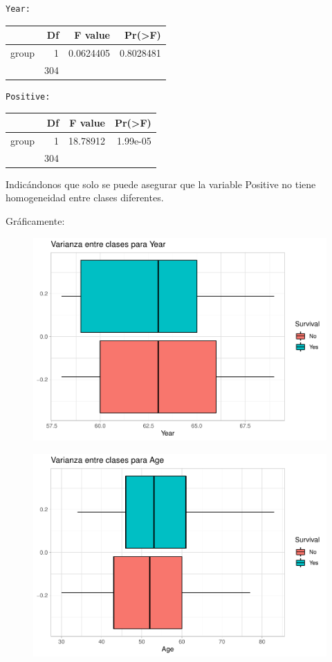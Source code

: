 \begin{verbatim}
Year:
\end{verbatim}

\begin{tabular}{l|r|r|r}
\hline
  & Df & F value & Pr(>F)\\
\hline
group & 1 & 0.0624405 & 0.8028481\\
\hline
 & 304 &  & \\
\hline
\end{tabular}

\begin{verbatim}
Positive:
\end{verbatim}

\begin{tabular}{l|r|r|r}
\hline
  & Df & F value & Pr(>F)\\
\hline
group & 1 & 18.78912 & 1.99e-05\\
\hline
 & 304 &  & \\
\hline
\end{tabular}

Indicándonos que solo se puede asegurar que la variable Positive no tiene homogeneidad entre clases diferentes.

\vspace{\baselineskip}

Gráficamente:

\begin{figure}[H]\center\includegraphics[width=.8\linewidth]{img/Clasificacion_files/figure-latex/unnamed-chunk-17-1}\caption{}\end{figure}

\begin{figure}[H]\center\includegraphics[width=.8\linewidth]{img/Clasificacion_files/figure-latex/unnamed-chunk-17-2}\caption{}\end{figure}

